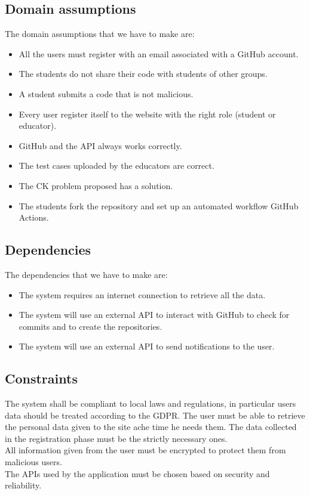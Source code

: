 \documentclass[12pt, a4paper]{report}
\begin{document}
    \subsection{Domain assumptions}
    The domain assumptions that we have to make are: 
    \begin{itemize}
        \item All the users must register with an email associated with a GitHub account.
        \item The students do not share their code with students of other groups. 
        \item A student submits a code that is not malicious. 
        \item Every user register itself to the website with the right role (student or educator).
        \item GitHub and the API always works correctly. 
        \item The test cases uploaded by the educators are correct. 
        \item The CK problem proposed has a solution. 
        \item The students fork the repository and set up an automated workflow GitHub Actions. 
    \end{itemize}

    \subsection{Dependencies}
    The dependencies that we have to make are: 
    \begin{itemize}
        \item The system requires an internet connection to retrieve all the data. 
        \item The system will use an external API to interact with GitHub to check for commits and to create the repositories.
        \item The system will use an external API to send notifications to the user. 
    \end{itemize}

    \subsection{Constraints}
    The system shall be compliant to local laws and regulations, in particular users data should be treated according to the GDPR. 
    The user must be able to retrieve the personal data given to the site ache time he needs them. 
    The data collected in the registration phase must be the strictly necessary ones. \\
    All information given from the user must be encrypted to protect them from malicious users. \\
    The APIs used by the application must be chosen based on security and reliability.
\end{document}
